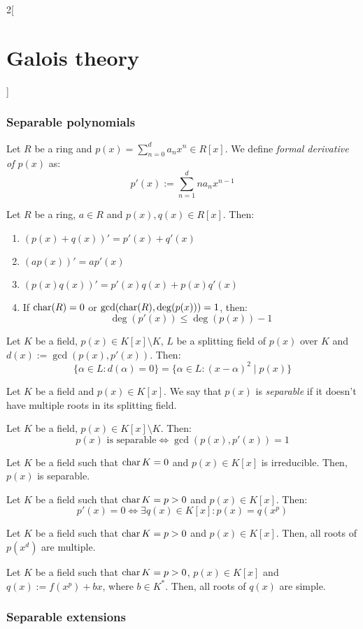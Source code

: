 \documentclass[../../../main.tex]{subfiles}
\begin{document}
\begin{multicols}{2}[\section{Galois theory}]
  \subsubsection{Separable polynomials}
  \begin{definition}
    Let $R$ be a ring and $p(x)=\sum_{n=0}^da_nx^n\in R[x]$. We define \textit{formal derivative of $p(x)$} as: $$p'(x):=\sum_{n=1}^dna_nx^{n-1}$$
  \end{definition}
  \begin{prop}
    Let $R$ be a ring, $a\in R$ and $p(x),q(x)\in R[x]$. Then:
    \begin{enumerate}
      \item ${(p(x)+q(x))}'=p'(x)+q'(x)$
      \item $(ap(x))'=ap'(x)$
      \item $(p(x)q(x))'=p'(x)q(x)+p(x)q'(x)$
      \item If $\operatorname{char}(R)=0$ or $\gcd(\operatorname{char}(R),\deg(p(x)))=1$, then: $$\deg(p'(x))\leq\deg(p(x))-1$$
    \end{enumerate}
  \end{prop}
  \begin{prop}
    Let $K$ be a field, $p(x)\in K[x]\setminus K$, $L$ be a splitting field of $p(x)$ over $K$ and $d(x):=\gcd(p(x),p'(x))$. Then:
    $$\{\alpha\in L:d(\alpha)=0\}=\{\alpha\in L:{(x-\alpha)}^2\mid p(x)\}$$
  \end{prop}
  \begin{definition}
    Let $K$ be a field and $p(x)\in K[x]$. We say that $p(x)$ is \textit{separable} if it doesn't have multiple roots in its splitting field.
  \end{definition}
  \begin{corollary}
    Let $K$ be a field, $p(x)\in K[x]\setminus K$. Then: $$p(x)\text{ is separable}\iff\gcd(p(x),p'(x))=1$$
  \end{corollary}
  \begin{corollary}
    Let $K$ be a field such that $\operatorname{char} K=0$ and $p(x)\in K[x]$ is irreducible. Then, $p(x)$ is separable.
  \end{corollary}
  \begin{lemma}
    Let $K$ be a field such that $\operatorname{char} K=p>0$ and $p(x)\in K[x]$. Then: $$p'(x)=0\iff\exists q(x)\in K[x]:p(x)=q(x^p)$$
  \end{lemma}
  \begin{corollary}
    Let $K$ be a field such that $\operatorname{char} K=p>0$ and $p(x)\in K[x]$. Then, all roots of $p(x^d)$ are multiple.
  \end{corollary}
  \begin{corollary}
    Let $K$ be a field such that $\operatorname{char} K=p>0$, $p(x)\in K[x]$ and $q(x):=f(x^p)+bx$, where $b\in K^*$. Then, all roots of $q(x)$ are simple.
  \end{corollary}
  \subsubsection{Separable extensions}
\end{multicols}
\end{document}

